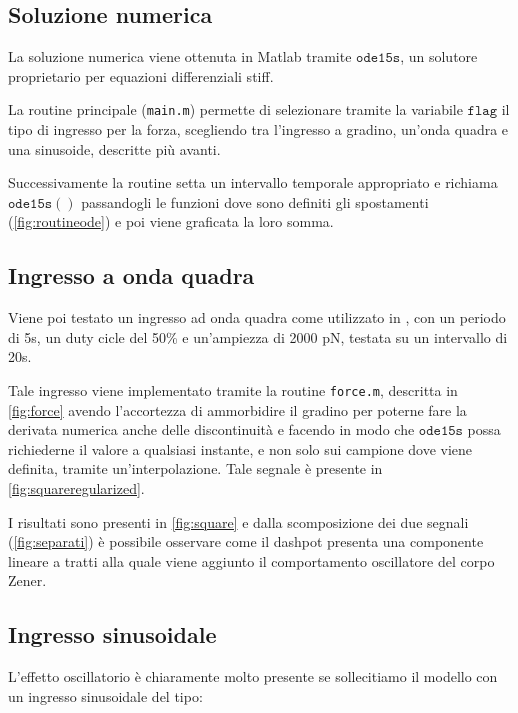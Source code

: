 \subsection{Soluzione numerica}

La soluzione numerica viene ottenuta in Matlab tramite $\mathtt{ode15s}$, un solutore proprietario per equazioni differenziali stiff.

La routine principale (\texttt{main.m}) permette di selezionare tramite la variabile $\mathtt{flag}$ il tipo di ingresso per la forza, scegliendo tra l'ingresso a gradino, un'onda quadra e una sinusoide, descritte più avanti.

Successivamente la routine setta un intervallo temporale appropriato e richiama $\mathtt{ode15s()}$ passandogli le funzioni dove sono definiti gli spostamenti (\cref{fig:routineode}) e poi viene graficata la loro somma.



\subsection{Ingresso a onda quadra}

Viene poi testato un ingresso ad onda quadra come utilizzato in \cite{bausch_local_1998}, con un periodo di 5s, un duty cicle del 50\% e un'ampiezza di 2000 pN, testata su un intervallo di 20s.

Tale ingresso viene implementato tramite la routine \texttt{force.m}, descritta in \cref{fig:force} avendo l'accortezza di ammorbidire il gradino per poterne fare la derivata numerica anche delle discontinuità e facendo in modo che $\mathtt{ode15s}$ possa richiederne il valore a qualsiasi instante, e non solo sui campione dove viene definita, tramite un'interpolazione.  Tale segnale è presente in \cref{fig:squareregularized}.

I risultati sono presenti in \cref{fig:square} e dalla scomposizione dei due segnali (\cref{fig:separati}) è possibile osservare come il dashpot presenta una componente lineare a tratti alla quale viene aggiunto il comportamento oscillatore del corpo Zener.



\subsection{Ingresso sinusoidale}

L'effetto oscillatorio è chiaramente molto presente se sollecitiamo il modello con un ingresso sinusoidale del tipo: 

